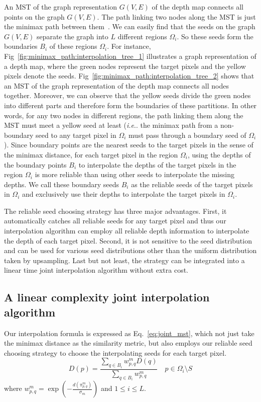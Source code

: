 \documentclass[preprint,10pt,5p,times,twocolumn]{elsarticle}
\makeatletter
\DeclareRobustCommand\onedot{\futurelet\@let@token\@onedot}
\def\@onedot{\ifx\@let@token.\else.\null\fi\xspace}
\def\ie{\emph{i.e}\onedot} \def\Ie{\emph{I.e}\onedot}
\makeatother
\begin{document}
An MST of the graph representation $G(V, E)$ of the depth map connects all points on the graph $G(V, E)$. The path linking two nodes along the MST is just the minimax path between them~\cite{Hu1961}. We can easily find that the seeds on the graph $G(V, E)$ separate the graph into $L$ different regions $\Omega_i$. So these seeds form the boundaries $B_i$ of these regions $\Omega_i$. For instance,  Fig~\ref{fig:minimax_path:interpolation_tree_1} illustrates a graph representation of a depth map, where the green nodes represent the target pixels and the yellow pixels denote the seeds.  Fig~\ref{fig:minimax_path:interpolation_tree_2} shows that an MST of the graph representation of the depth map connects all nodes together. Moreover, we can observe that the yellow seeds divide the green nodes into different parts and therefore form the boundaries of these partitions. In other words, for any two nodes in different regions, the path linking them along the MST must meet a yellow seed at least (\ie the minimax path from a non-boundary seed to any target pixel in $\Omega_i$ must pass through a boundary seed of $\Omega_i$). Since boundary points are the nearest seeds to the target pixels in the sense of the minimax distance, for each target pixel in the region $\Omega_i$,  using the depths of the boundary points $B_i$ to interpolate the depths of the target pixels in the region $\Omega_i$ is more reliable than using other seeds to interpolate
the missing depths. We call these boundary seeds $B_i$ as the reliable seeds of the target pixels in $\Omega_i$ and exclusively use their depths to interpolate the target pixels in $\Omega_i$.


The reliable seed choosing strategy has three major advantages. First, it automatically catches all reliable seeds for any target pixel and thus our interpolation algorithm can employ all reliable depth information to interpolate the depth of each target pixel. Second, it is not sensitive to the seed distribution and can be used for various seed distributions other than the uniform distribution taken by upsampling. Last but not  least, the strategy can be integrated into a linear time joint interpolation algorithm without extra cost.

\subsection{A linear complexity joint interpolation algorithm}
%
Our interpolation formula is expressed as Eq.~\eqref{eq:joint_mst}, which not just take the minimax distance as the similarity metric, but also employs our reliable seed choosing strategy to choose the interpolating seeds for each target pixel.
%
\begin{equation}
D(p) = \frac{ \sum\nolimits_{q \in B_i} {w^m_{p,q}D(q)} }{ {\sum\nolimits_{q \in B_i} {w^m_{p,q}}}} \quad p \in \Omega_i \setminus S \label{eq:joint_mst}
\end{equation}
%
where $w^m_{p,q} = \exp( - \frac{{d}(\pi_{{p},{q}}^m)}{\sigma_m})$ and $1 \leq i \leq L$.
\end{document}
